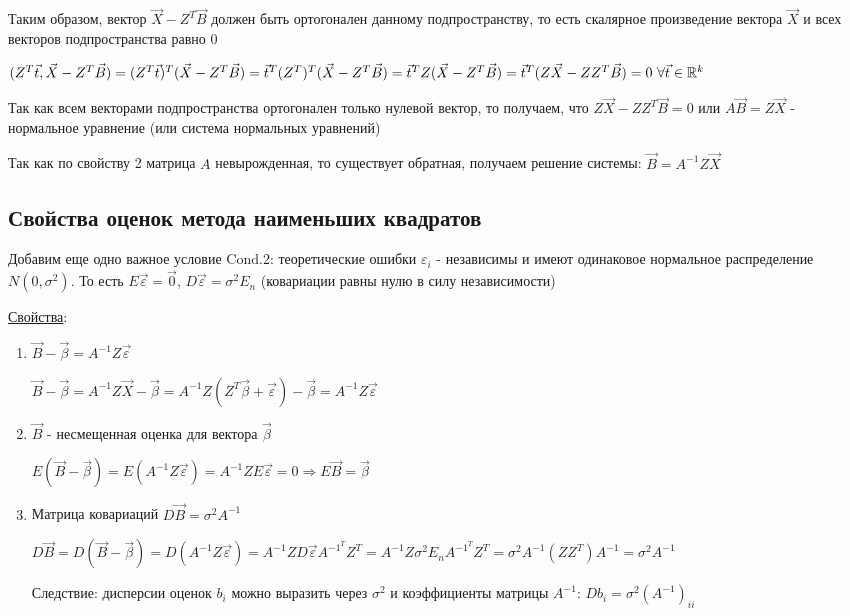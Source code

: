 \documentclass[12pt]{article}
\begin{document}
Таким образом, вектор $\vec X - Z^T \vec B$ должен быть ортогонален данному подпространству, то есть скалярное произведение вектора $\vec X$ и всех векторов подпространства равно 0

$(Z^T \vec t, \vec X - Z^T \vec B) = (Z^T \vec t)^T (\vec X - Z^T \vec B) = {\vec t}^T (Z^T)^T (\vec X - Z^T \vec B) = {\vec t}^T Z (\vec X - Z^T \vec B) = 
{\vec t}^T (Z \vec X - Z Z ^T \vec B) = 0 \ \forall \vec t \in \mathbb{R}^k$

Так как всем векторами подпространства ортогонален только нулевой вектор, то получаем, что $Z \vec X - Z Z^T \vec B = 0$ или $A \vec B = Z \vec X$ - нормальное уравнение (или система нормальных уравнений)

Так как по свойству 2 матрица $A$ невырожденная, то существует обратная, получаем решение системы: $\vec B = A^{-1} Z \vec X$

\subsection{Свойства оценок метода наименьших квадратов}

Добавим еще одно важное условие $\mathrm{Cond. 2}$: теоретические ошибки $\varepsilon_i$ - независимы и имеют одинаковое нормальное распределение $N(0, \sigma^2)$.
То есть $E \vec \varepsilon = \vec 0$, $D \vec \varepsilon = \sigma^2 E_n$ (ковариации равны нулю в силу независимости)

\underline{Свойства}:

\begin{enumerate}
    \item $\vec B - \vec \beta = A^{-1} Z \vec \varepsilon$

    \begin{MyProof}
        $\vec B - \vec \beta = A^{-1} Z \vec X - \vec \beta = A^{-1} Z (Z^T \vec \beta + \vec \varepsilon) - \vec \beta = A^{-1} Z \vec \varepsilon$
    \end{MyProof}

    \item $\vec B$ - несмещенная оценка для вектора $\vec \beta$

    \begin{MyProof}
        $E(\vec B - \vec \beta) = E(A^{-1} Z \vec \varepsilon) = A^{-1} Z E \vec \varepsilon = 0 \Longrightarrow E \vec B = \vec \beta$
    \end{MyProof}

    \item Матрица ковариаций $D \vec B = \sigma^2 A^{-1}$

    \begin{MyProof}
        $D \vec B = D (\vec B - \vec \beta) = D (A^{-1} Z \vec \varepsilon) = A^{-1} Z D \vec \varepsilon A^{-1}^T Z^T = A^{-1} Z \sigma^2 E_n A^{-1}^T Z^T = \sigma^2 A^{-1} (Z Z^T) A^{-1} = \sigma^2 A^{-1}$
    \end{MyProof}

    Следствие: дисперсии оценок $b_i$ можно выразить через $\sigma^2$ и коэффициенты матрицы $A^{-1}$: $D b_i = \sigma^2 (A^{-1})_{ii}$

\end{enumerate}
\end{document}
